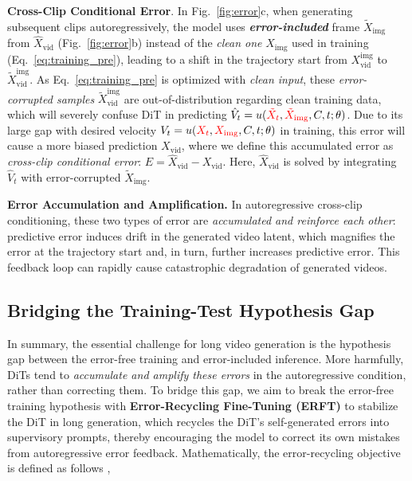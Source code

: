\documentclass{article} %
\newcommand\vid{\mathrm{vid}}
\newcommand\img{\mathrm{img}}
\newcommand{\err}{E}
\newcommand{\highlight}[1]{\textbf{\emph{#1}}}
\begin{document}
\noindent\textbf{Cross-Clip Conditional Error}. In Fig.~\ref{fig:error}c, when generating subsequent clips autoregressively, the model uses \highlight{error-included} frame $\tilde{X}_\img$ from $\hat{X}_\vid$ (Fig.~\ref{fig:error}b) instead of the \emph{clean one} $X_\img$ used in training (Eq.~\ref{eq:training_pre}), leading to a shift in the trajectory start from $X^\img_\vid$ to $\tilde{X}^\img_\vid$. As Eq.~\ref{eq:training_pre} is optimized with \emph{clean input}, these \emph{error-corrupted samples} $\tilde{X}^\img_\vid$ are out-of-distribution regarding clean training data, which will severely confuse DiT in predicting $\hat{V}_t = u({\color{red}{\tilde{X}_t}}, {\color{red}{\tilde{X}_\img}}, C, t; \theta)$. Due to its large gap with desired velocity $V_t = u({\color{red}{X_t}}, {\color{red}{X_\img}}, C, t; \theta)$ in training, this error will cause a more biased prediction $X_\vid$, where we define this accumulated error as \emph{cross-clip conditional error}: $\err= \hat{X}_\vid - X_\vid$. Here, $\hat{X}_\vid$ is solved by integrating $\hat{V}_t$ with error-corrupted $\tilde{X}_\img$. 

\noindent\textbf{Error Accumulation and Amplification.} In autoregressive cross-clip conditioning, these two types of error are \emph{accumulated and reinforce each other}: predictive error induces drift in the generated video latent, which magnifies the error at the trajectory start and, in turn, further increases predictive error. This feedback loop can rapidly cause catastrophic degradation of generated videos.

\subsection{Bridging the Training-Test Hypothesis Gap}\label{sec:mot_obj}\vspace{-4pt}
In summary, the essential challenge for long video generation is the hypothesis gap between the error-free training and error-included inference. More harmfully, DiTs tend to \emph{accumulate and amplify these errors} in the autoregressive condition, rather than correcting them. To bridge this gap, we aim to break the error-free training hypothesis with \textbf{Error-Recycling Fine-Tuning (ERFT)} to stabilize the DiT in long generation, which recycles the DiT’s self-generated errors into supervisory prompts, thereby encouraging the model to correct its own mistakes from autoregressive error feedback. Mathematically, the error-recycling objective is defined as follows ,
\end{document}
